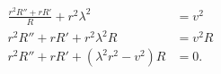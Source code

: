 \begin{align*}
\frac{r^2R'' + rR'}{R} + r^2\lambda^2 &= v^2 \\
r^2R'' + rR' + r^2\lambda^2R &= v^2R \\
r^2R'' + rR' + (\lambda^2r^2 - v^2)R &= 0.
\end{align*}